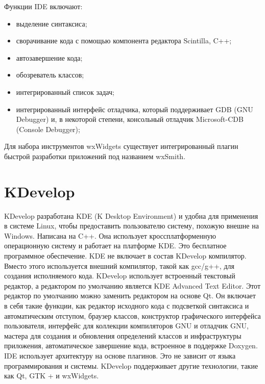 Функции IDE включают:\\ 
\begin{itemize}
    \item выделение синтаксиса;\\
    \item сворачивание кода с помощью компонента редактора Scintilla, C++;\\ 
    \item автозавершение кода; \\
    \item обозреватель классов;\\ 
    \item интегрированный список задач;\\ 
    \item интегрированный интерфейс отладчика, который поддерживает GDB (GNU Debugger) и, в 
        некоторой степени, консольный отладчик Microsoft-CDB (Console Debugger);\\ 
\end{itemize}

Для набора инструментов wxWidgets существует интегрированный плагин быстрой разработки приложений 
под названием wxSmith.\\

\section{KDevelop}
KDevelop разработана KDE (K Desktop Environment) и удобна для применения в системе Linux, чтобы предоставить 
пользователю систему, похожую внешне на Windows. Написана на C++. Она использует кроссплатформенную
операционную систему и работает на платформе KDE. Это бесплатное программное обеспечение. KDE не 
включает в состав KDevelop компилятор. Вместо этого используется внешний компилятор, такой как 
gcc/g++, для создания исполняемого кода. KDevelop использует встроенный текстовый редактор, а 
редактором по умолчанию является KDE Advanced Text Editor. Этот редактор по умолчанию можно 
заменить редактором на основе Qt. Он включает в себя такие функции, как редактор исходного кода с
подсветкой синтаксиса и автоматическим отступом, браузер классов, конструктор графического 
интерфейса пользователя, интерфейс для коллекции компиляторов GNU и отладчик GNU, мастера для 
создания и обновления определений классов и инфраструктуры приложения, автоматическое завершение 
кода, встроенное в поддержке Doxygen. IDE использует архитектуру на основе плагинов. Это не зависит 
от языка программирования и системы. KDevelop поддерживает другие технологии, такие как Qt, GTK + и 
wxWidgets.\\

